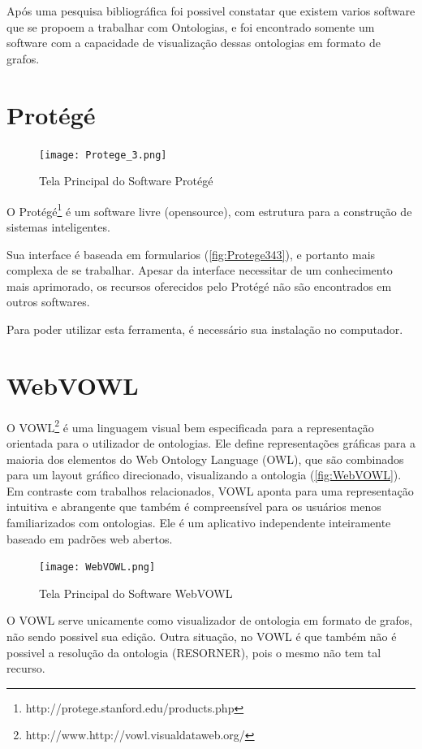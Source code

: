 \label{trabalhosrelacionados}

Após uma pesquisa bibliográfica foi possivel constatar que existem varios software que se propoem a trabalhar com Ontologias, e foi encontrado somente um software com a capacidade de visualização dessas ontologias em formato de grafos.

\section{Protégé}

\begin{figure}[h]
    \centering
    \texttt{[image: Protege\_3.png]}
    \caption{Tela Principal do Software Protégé}
    \label{fig:Protege343}
\end{figure}

O Protégé\footnote{http://protege.stanford.edu/products.php} é um software livre (opensource), com estrutura para a construção de sistemas inteligentes.

Sua interface é baseada em formularios (\autoref{fig:Protege343}), e portanto mais complexa de se trabalhar. Apesar da interface necessitar de um conhecimento mais aprimorado, os recursos oferecidos pelo Protégé não são encontrados em outros softwares.

Para poder utilizar esta ferramenta, é necessário sua instalação no computador.

\section{WebVOWL}
O VOWL\footnote{http://www.http://vowl.visualdataweb.org/} é uma linguagem visual bem especificada para a representação orientada para o utilizador de ontologias. Ele define representações gráficas para a maioria dos elementos do Web Ontology Language (OWL), que são combinados para um layout gráfico direcionado, visualizando a ontologia (\autoref{fig:WebVOWL}). Em contraste com trabalhos relacionados, VOWL aponta para uma representação intuitiva e abrangente que também é compreensível para os usuários menos familiarizados com ontologias. Ele é um aplicativo independente inteiramente baseado em padrões web abertos. 


\begin{figure}[h]
    \centering
    \texttt{[image: WebVOWL.png]}
    \caption{Tela Principal do Software WebVOWL}
    \label{fig:WebVOWL}
\end{figure}

O VOWL serve unicamente como visualizador de ontologia em formato de grafos, não sendo possivel sua edição. Outra situação, no VOWL é que também não é possivel a resolução da ontologia (RESORNER), pois o mesmo não tem tal recurso.

